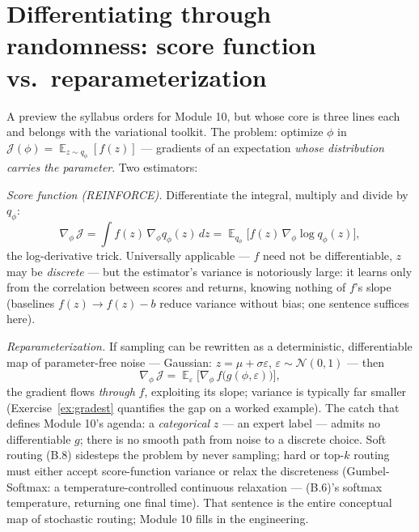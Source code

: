 \documentclass[11pt]{article}
\numberwithin{equation}{section}
\theoremstyle{plain}
\theoremstyle{definition}
\theoremstyle{remark}
\DeclareMathOperator{\E}{\mathbb{E}}
\newcommand{\Normal}{\mathcal{N}}
\begin{document}
\section{Differentiating through randomness: score function vs.\ reparameterization}\label{sec:gradest}

A preview the syllabus orders for Module 10, but whose core is three lines each and belongs with the variational toolkit. The problem: optimize $\phi$ in $\mathcal{J}(\phi) = \E_{z \sim q_\phi}[f(z)]$ --- gradients of an expectation \emph{whose distribution carries the parameter}. Two estimators:

\emph{Score function (REINFORCE).} Differentiate the integral, multiply and divide by $q_\phi$:
\begin{equation}
\nabla_\phi\, \mathcal{J}
= \int f(z)\, \nabla_\phi q_\phi(z)\, dz
= \E_{q_\phi}\!\big[ f(z)\, \nabla_\phi \log q_\phi(z) \big],
\label{eq:score}
\end{equation}
the log-derivative trick. Universally applicable --- $f$ need not be differentiable, $z$ may be \emph{discrete} --- but the estimator's variance is notoriously large: it learns only from the correlation between scores and returns, knowing nothing of $f$'s slope (baselines $f(z) \to f(z) - b$ reduce variance without bias; one sentence suffices here).

\emph{Reparameterization.} If sampling can be rewritten as a deterministic, differentiable map of parameter-free noise --- Gaussian: $z = \mu + \sigma \varepsilon$, $\varepsilon \sim \Normal(0,1)$ --- then
\begin{equation}
\nabla_\phi\, \mathcal{J} = \E_{\varepsilon}\big[ \nabla_\phi\, f\big(g(\phi, \varepsilon)\big) \big],
\label{eq:reparam}
\end{equation}
the gradient flows \emph{through} $f$, exploiting its slope; variance is typically far smaller (Exercise~\ref{ex:gradest} quantifies the gap on a worked example). The catch that defines Module 10's agenda: a \emph{categorical} $z$ --- an expert label --- admits no differentiable $g$; there is no smooth path from noise to a discrete choice. Soft routing (B.8) sidesteps the problem by never sampling; hard or top-$k$ routing must either accept score-function variance or relax the discreteness (Gumbel-Softmax: a temperature-controlled continuous relaxation --- (B.6)'s softmax temperature, returning one final time). That sentence is the entire conceptual map of stochastic routing; Module 10 fills in the engineering.
\end{document}
